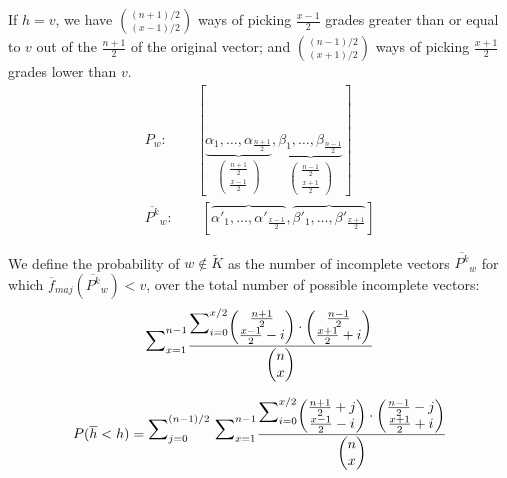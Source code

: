 \documentclass[version=3.21, pagesize, twoside=off, bibliography=totoc, DIV=calc, fontsize=12pt, a4paper]{scrartcl}
\begin{document}
If $h=v$, we have $\binom{(n+1)/2}{(x-1)/2}$ ways of picking $\frac{x-1}{2}$ grades greater than or equal to $v$ out of the $\frac{n+1}{2}$ of the original vector; and $\binom{(n-1)/2}{(x+1)/2}$ ways of picking $\frac{x+1}{2}$ grades lower than $v$.
\begin{align}
	P_{w}: \qquad [ \underbrace{\alpha_1, \dots , \alpha_{\frac{n+1}{2}}}_{\begin{pmatrix}\frac{n+1}{2} \\ \frac{x-1}{2}\end{pmatrix}}, \underbrace{\beta_1, \dots , \beta_{\frac{n-1}{2}}}_{\begin{pmatrix}\frac{n-1}{2} \\ {\frac{x+1}{2}}\end{pmatrix}} ] \\
	\overline{P^k}_w:\qquad [ \overbrace{\alpha'_1, \dots , \alpha'_{\frac{x-1}{2}}}, \overbrace{\beta'_1, \dots , \beta'_{\frac{x+1}{2}}}]
\end{align} 
\newcommand{\largemath}[1]{{\mathlarger{\mathlarger{\mathlarger{\mathlarger{\mathlarger#1}}}}}}

We define the probability of $w \notin \tilde{K}$ as the number of incomplete vectors $\overline{P^k}_w$ for which $\overline{f}_{maj}(\overline{P^k}_w) < v$, over the total number of possible incomplete vectors:
\[ \largemath{\sum}_{x=1}^{n-1}{ \frac{ \largemath{\sum}_{i=0}^{x/2}{ \begin{pmatrix}\frac{n+1}{2} \\ {\frac{x-1}{2}-i}\end{pmatrix} \cdot \begin{pmatrix}\frac{n-1}{2} \\ {\frac{x+1}{2}+i}\end{pmatrix} }}{\begin{pmatrix}n \\ x\end{pmatrix}} } \]


\[ P(\overline{h}<h)= \largemath{\sum}_{j=0}^{(n-1)/2}{ \ \largemath{\sum}_{x=1}^{n-1}{ \frac{ \largemath{\sum}_{i=0}^{x/2}{ \begin{pmatrix}\frac{n+1}{2}+j \\ {\frac{x-1}{2}-i}\end{pmatrix} \cdot \begin{pmatrix}\frac{n-1}{2}-j \\ {\frac{x+1}{2}+i}\end{pmatrix} }}{\begin{pmatrix}n \\ x\end{pmatrix}} }} \]
\end{document}
